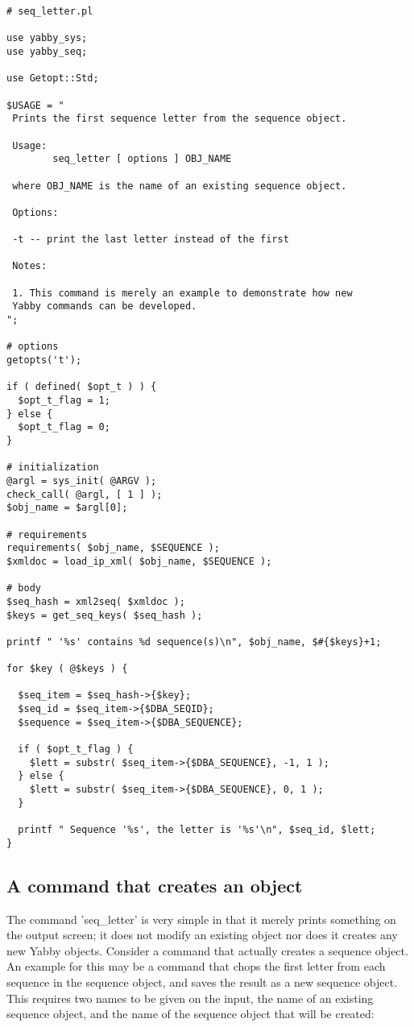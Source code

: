 \begin{verbatim}
# seq_letter.pl

use yabby_sys;
use yabby_seq;

use Getopt::Std;

$USAGE = "
 Prints the first sequence letter from the sequence object. 

 Usage:
        seq_letter [ options ] OBJ_NAME

 where OBJ_NAME is the name of an existing sequence object.

 Options:

 -t -- print the last letter instead of the first

 Notes:

 1. This command is merely an example to demonstrate how new
 Yabby commands can be developed.
";

# options
getopts('t');

if ( defined( $opt_t ) ) {
  $opt_t_flag = 1;
} else {
  $opt_t_flag = 0;
}

# initialization
@argl = sys_init( @ARGV );
check_call( @argl, [ 1 ] );
$obj_name = $argl[0];

# requirements
requirements( $obj_name, $SEQUENCE );
$xmldoc = load_ip_xml( $obj_name, $SEQUENCE );

# body
$seq_hash = xml2seq( $xmldoc );
$keys = get_seq_keys( $seq_hash );

printf " '%s' contains %d sequence(s)\n", $obj_name, $#{$keys}+1;

for $key ( @$keys ) {

  $seq_item = $seq_hash->{$key};
  $seq_id = $seq_item->{$DBA_SEQID};
  $sequence = $seq_item->{$DBA_SEQUENCE};

  if ( $opt_t_flag ) {
    $lett = substr( $seq_item->{$DBA_SEQUENCE}, -1, 1 );
  } else {
    $lett = substr( $seq_item->{$DBA_SEQUENCE}, 0, 1 );
  }

  printf " Sequence '%s', the letter is '%s'\n", $seq_id, $lett;
}
\end{verbatim}

\subsection{A command that creates an object}

The command 'seq\_letter' is very simple in that it merely prints
something on the output screen; it does not modify an existing
object nor does it creates any new Yabby objects. Consider a command
that actually creates a sequence object. An example for this may
be a command that chops the first letter from each sequence in
the sequence object, and saves the result as a new sequence object.
This requires two names to be given on the input, the name of
an existing sequence object, and the name of the sequence object
that will be created:

